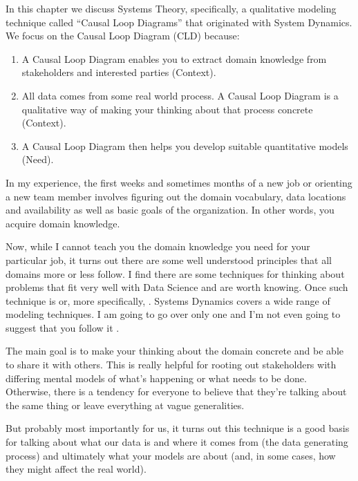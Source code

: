\documentclass[letterpaper,10pt,english]{sphinxmanual}
\begin{document}
In this chapter we discuss Systems Theory, specifically, a qualitative modeling technique called “Causal Loop Diagrams” that originated with System Dynamics. We focus on the Causal Loop Diagram (CLD) because:
\begin{enumerate}
\def\theenumi{\arabic{enumi}}
\def\labelenumi{\theenumi .}
\makeatletter\def\p@enumii{\p@enumi \theenumi .}\makeatother
\item {} 
A Causal Loop Diagram enables you to extract domain knowledge from stakeholders and interested parties (Context).

\item {} 
All data comes from some real world process. A Causal Loop Diagram is a qualitative way of making your thinking about that process concrete (Context).

\item {} 
A Causal Loop Diagram then helps you develop suitable quantitative models (Need).

\end{enumerate}

In my experience, the first weeks and sometimes months of a new job or orienting a new team member involves figuring out the domain vocabulary, data locations and availability as well as basic goals of the organization. In other words, you acquire domain knowledge.

Now, while I cannot teach you the domain knowledge you need for your particular job, it turns out there are some well understood principles that all domains more or less follow. I find there are some  techniques for thinking about problems that fit very well with Data Science and are worth knowing. Once such technique is  or, more specifically, . Systems Dynamics covers a wide range of modeling techniques. I am going to go over only one and I’m not even
going to suggest that you follow it .

The main goal is to make your thinking about the domain concrete and be able to share it with others. This is really helpful for rooting out stakeholders with differing mental models of what’s happening or what needs to be done. Otherwise, there is a tendency for everyone to believe that they’re talking about the same thing or leave everything at vague generalities.

But probably most importantly for us, it turns out this technique is a good basis for talking about what our data is and where it comes from (the data generating process) and ultimately what your models are about (and, in some cases, how they might affect the real world).
\end{document}
